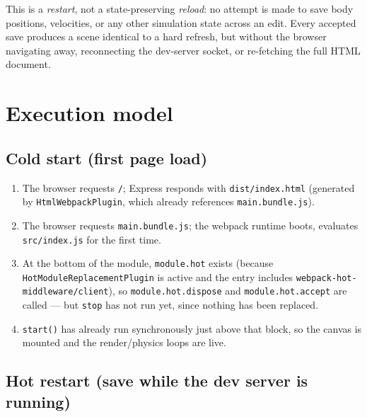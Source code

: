 \documentclass{article}
\begin{document}
This is a \emph{restart}, not a state-preserving \emph{reload}: no attempt
is made to save body positions, velocities, or any other simulation state
across an edit. Every accepted save produces a scene identical to a hard
refresh, but without the browser navigating away, reconnecting the
dev-server socket, or re-fetching the full HTML document.

\section{Execution model}

\subsection{Cold start (first page load)}

\begin{enumerate}
  \item The browser requests \texttt{/}; Express responds with
    \texttt{dist/index.html} (generated by \texttt{HtmlWebpackPlugin}, which
    already references \texttt{main.bundle.js}).
  \item The browser requests \texttt{main.bundle.js}; the webpack runtime
    boots, evaluates \texttt{src/index.js} for the first time.
  \item At the bottom of the module, \texttt{module.hot} exists (because
    \texttt{HotModuleReplacementPlugin} is active and the entry includes
    \texttt{webpack-hot-middleware/client}), so \texttt{module.hot.dispose}
    and \texttt{module.hot.accept} are called --- but \texttt{stop} has not
    run yet, since nothing has been replaced.
  \item \texttt{start()} has already run synchronously just above that
    block, so the canvas is mounted and the render/physics loops are live.
\end{enumerate}

\subsection{Hot restart (save while the dev server is running)}
\end{document}
